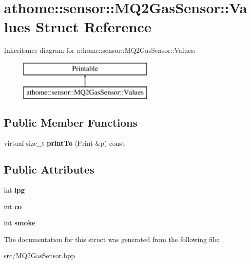\hypertarget{structathome_1_1sensor_1_1_m_q2_gas_sensor_1_1_values}{}\section{athome\+:\+:sensor\+:\+:M\+Q2\+Gas\+Sensor\+:\+:Values Struct Reference}
\label{structathome_1_1sensor_1_1_m_q2_gas_sensor_1_1_values}
Inheritance diagram for athome\+:\+:sensor\+:\+:M\+Q2\+Gas\+Sensor\+:\+:Values\+:\begin{figure}[H]
\begin{center}
\leavevmode
\includegraphics[height=2.000000cm]{structathome_1_1sensor_1_1_m_q2_gas_sensor_1_1_values}
\end{center}
\end{figure}
\subsection*{Public Member Functions}
\begin{DoxyCompactItemize}
\item 
\mbox{\label{structathome_1_1sensor_1_1_m_q2_gas_sensor_1_1_values_a91a0cb5bb666a11e7cbdbaa7cad1d102}} 
virtual size\+\_\+t {\bfseries print\+To} (Print \&p) const
\end{DoxyCompactItemize}
\subsection*{Public Attributes}
\begin{DoxyCompactItemize}
\item 
\mbox{\label{structathome_1_1sensor_1_1_m_q2_gas_sensor_1_1_values_ab4c361d142adf2606b02abe045c9e879}} 
int {\bfseries lpg}
\item 
\mbox{\label{structathome_1_1sensor_1_1_m_q2_gas_sensor_1_1_values_afb7043620ff1fb73d8529005b84cc979}} 
int {\bfseries co}
\item 
\mbox{\label{structathome_1_1sensor_1_1_m_q2_gas_sensor_1_1_values_a2a653baf83c9be7b6e417da6ae54e769}} 
int {\bfseries smoke}
\end{DoxyCompactItemize}


The documentation for this struct was generated from the following file\+:\begin{DoxyCompactItemize}
\item 
src/M\+Q2\+Gas\+Sensor.\+hpp\end{DoxyCompactItemize}
